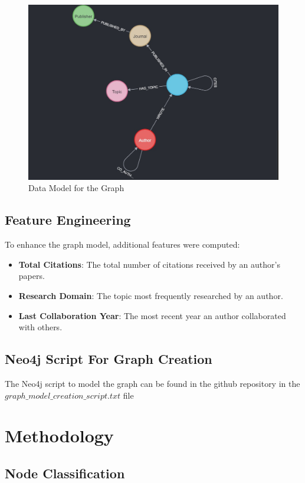 \documentclass[conference, 12pt]{IEEEtran}
\begin{document}
\begin{figure}[h]
    \centering
    \includegraphics[width=\linewidth]{images/graph_model.jpg} 
    \caption{Data Model for the Graph}
    \label{fig:data_model}
\end{figure}

\subsection{Feature Engineering}
To enhance the graph model, additional features were computed:
\begin{itemize}
    \item \textbf{Total Citations}: The total number of citations received by an author's papers.
    \item \textbf{Research Domain}: The topic most frequently researched by an author.
    \item \textbf{Last Collaboration Year}: The most recent year an author collaborated with others.
\end{itemize}

\subsection{Neo4j Script For Graph Creation}
The Neo4j script to model the graph can be found in the github repository
in the $graph\_model\_creation\_script.txt$ file

\section{Methodology}

\subsection{Node Classification}
\end{document}
